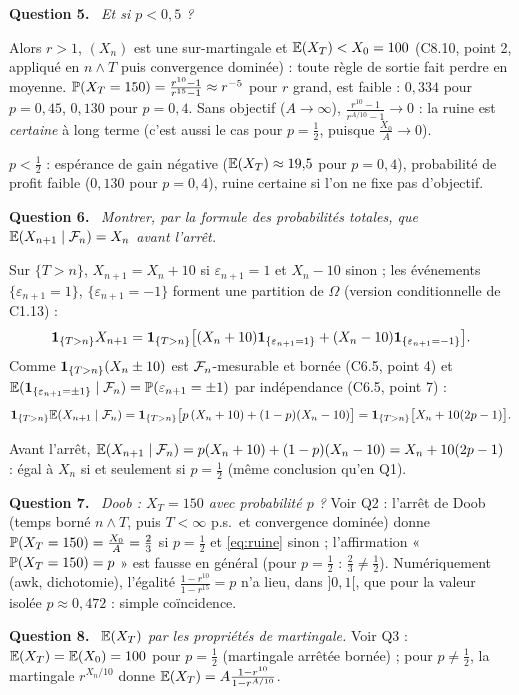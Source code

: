 \documentclass[11pt,a4paper]{article}
\newcommand{\question}[1]{\par\medskip\noindent\textbf{Question #1.}~}
\begin{document}
\begin{exo}
\question{5} \emph{Et si $p<0{,}5$ ?}

Alors $r>1$, $(X_n)$ est une sur-martingale et $\mathbb{E}(X_T)<X_0=100$ (C8.10, point 2, appliqué en $n\wedge T$ puis convergence dominée) :
toute règle de sortie fait perdre en moyenne. $\mathbb{P}(X_T=150)=\frac{r^{10}-1}{r^{15}-1}\approx r^{-5}$ pour $r$ grand, est faible :
$0{,}334$ pour $p=0{,}45$, $0{,}130$ pour $p=0{,}4$. Sans objectif ($A\to\infty$), $\frac{r^{10}-1}{r^{A/10}-1}\to0$ : la ruine est
\emph{certaine} à long terme (c'est aussi le cas pour $p=\frac12$, puisque $\frac{X_0}A\to0$).
\begin{resultat}
$p<\frac12$ : espérance de gain négative ($\mathbb{E}(X_T)\approx19{,}5$ pour $p=0{,}4$), probabilité de profit faible ($0{,}130$ pour $p=0{,}4$),
ruine certaine si l'on ne fixe pas d'objectif.
\end{resultat}

\question{6} \emph{Montrer, par la formule des probabilités totales, que $\mathbb{E}(X_{n+1}\mid\mathcal{F}_n)=X_n$ avant l'arrêt.}

Sur $\{T>n\}$, $X_{n+1}=X_n+10$ si $\varepsilon_{n+1}=1$ et $X_n-10$ sinon ; les événements $\{\varepsilon_{n+1}=1\}$, $\{\varepsilon_{n+1}=-1\}$
forment une partition de $\Omega$ (version conditionnelle de C1.13) :
\[\mathbf{1}_{\{T>n\}}X_{n+1}=\mathbf{1}_{\{T>n\}}\bigl[(X_n+10)\mathbf{1}_{\{\varepsilon_{n+1}=1\}}+(X_n-10)\mathbf{1}_{\{\varepsilon_{n+1}=-1\}}\bigr].\]
Comme $\mathbf{1}_{\{T>n\}}(X_n\pm10)$ est $\mathcal{F}_n$-mesurable et bornée (C6.5, point 4) et
$\mathbb{E}(\mathbf{1}_{\{\varepsilon_{n+1}=\pm1\}}\mid\mathcal{F}_n)=\mathbb{P}(\varepsilon_{n+1}=\pm1)$ par indépendance (C6.5, point 7) :
\[\mathbf{1}_{\{T>n\}}\mathbb{E}(X_{n+1}\mid\mathcal{F}_n)=\mathbf{1}_{\{T>n\}}\bigl[p\,(X_n+10)+(1-p)(X_n-10)\bigr]=\mathbf{1}_{\{T>n\}}\bigl[X_n+10(2p-1)\bigr].\]
\begin{resultat}
Avant l'arrêt, $\mathbb{E}(X_{n+1}\mid\mathcal{F}_n)=p(X_n+10)+(1-p)(X_n-10)=X_n+10(2p-1)$ : égal à $X_n$ si et seulement si $p=\frac12$ (même conclusion qu'en Q1).
\end{resultat}

\question{7} \emph{Doob : $X_T=150$ avec probabilité $p$ ?} Voir Q2 : l'arrêt de Doob (temps borné $n\wedge T$, puis $T<\infty$ p.s.\ et
convergence dominée) donne $\mathbb{P}(X_T=150)=\frac{X_0}{A}=\frac23$ si $p=\frac12$ et \eqref{eq:ruine} sinon ; l'affirmation
« $\mathbb{P}(X_T=150)=p$ » est fausse en général (pour $p=\frac12$ : $\frac23\neq\frac12$). Numériquement (awk, dichotomie), l'égalité
$\frac{1-r^{10}}{1-r^{15}}=p$ n'a lieu, dans $]0,1[$, que pour la valeur isolée $p\approx0{,}472$ : simple coïncidence.

\question{8} \emph{$\mathbb{E}(X_T)$ par les propriétés de martingale.} Voir Q3 : $\mathbb{E}(X_T)=\mathbb{E}(X_0)=100$ pour $p=\frac12$ (martingale arrêtée bornée) ;
pour $p\neq\frac12$, la martingale $r^{X_n/10}$ donne $\mathbb{E}(X_T)=A\frac{1-r^{10}}{1-r^{A/10}}$.


\end{exo}
\end{document}
